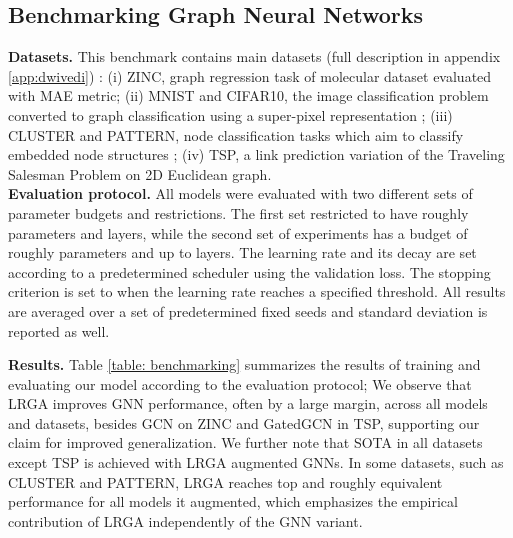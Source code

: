 \documentclass{article} \usepackage{iclr2021_conference,times}
\begin{document}
\subsection{Benchmarking Graph Neural Networks \citep{dwivedi2020benchmarking}} \label{sec: benchmarking_gnn}
\textbf{Datasets.} 
This benchmark contains  main datasets (full description in appendix \ref{app:dwivedi}) : (i) ZINC, graph regression task of molecular dataset evaluated with MAE metric; (ii) MNIST and CIFAR10, the image classification problem converted to graph classification using a super-pixel representation \citep{Knyazev_superpixel}; (iii) CLUSTER and PATTERN, node classification tasks which aim to classify embedded node structures \citep{abbe2017community}; (iv) TSP, a link prediction variation of the Traveling Salesman Problem \citep{joshi2019efficient} on 2D Euclidean graph. 
\\
\textbf{Evaluation protocol.} All models were evaluated with two different sets of parameter budgets and restrictions. The first set restricted to have roughly  parameters and  layers, while the second set of experiments has a budget of roughly  parameters and up to  layers. The learning rate and its decay are set according to a predetermined scheduler using the validation loss. The stopping criterion is set to when the learning rate reaches a specified threshold. All results are averaged over a set of predetermined fixed seeds and standard deviation is reported as well. 
\vspace{-5pt}

\textbf{Results.} Table \ref{table: benchmarking} summarizes the results of training and evaluating our model according to the evaluation protocol; We observe that LRGA improves GNN performance, often by a large margin, across all models and datasets, besides GCN on ZINC and GatedGCN in TSP, supporting our claim for improved generalization. We further note that SOTA in all datasets except TSP is achieved with LRGA augmented GNNs. In some datasets, such as CLUSTER and PATTERN, LRGA reaches top and roughly equivalent performance for all models it augmented, which emphasizes the empirical contribution of LRGA independently of the GNN variant.
\end{document}

